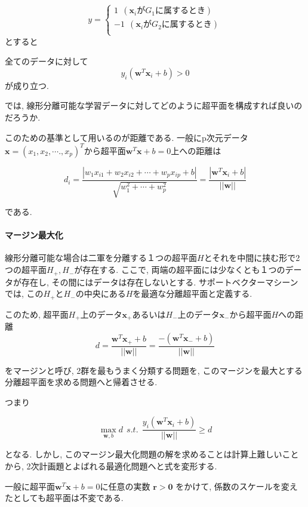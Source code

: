 \documentclass{jarticle}
\begin{document}
\begin{equation}
y = 
     \left\{
     \begin{aligned}
        1\ \ (\bm{x}_i\mbox{が} G_1 \mbox{に属するとき}) \\
        -1\ \ (\bm{x}_i\mbox{が} G_2 \mbox{に属するとき})\\
     \end{aligned}
     \right.
 \end{equation}
とすると 

全てのデータに対して
\[y_i(\bm{w}^T\bm{x}_i + b) > 0\]
が成り立つ.
 
 では, 線形分離可能な学習データに対してどのように超平面を構成すれば良いのだろうか.
 
このための基準として用いるのが距離である. 一般にp次元データ\(\bm{x} = (x_1, x_2, \cdots., x_p)^T\)から超平面$ \bm{w}^T\bm{x} + b = 0$上への距離は

 
 \[ d_i = \frac{|w_1x_{i1} + w_2x_{i2} + \cdots + w_px_{ip} + b|}{\sqrt{w_1^2 +\cdots+ w_p^2}} = \frac{|\bm{w}^T\bm{x}_i + b|}{||\bm{w}||}\]
 
 である.
 
 
\paragraph{マージン最大化}
 
 線形分離可能な場合は二軍を分離する１つの超平面$H$とそれを中間に挟む形で2つの超平面$ H_+, H_-$が存在する.
ここで, 両端の超平面には少なくとも１つのデータが存在し, その間にはデータは存在しないとする. サポートベクターマシーンでは, この$ H_+$と$ H_-$の中央にある$H$を最適な分離超平面と定義する.
 
 
 このため, 超平面$H_+$上のデータ$\bm{x}_+$あるいは$H_-$上のデータ$\bm{x}_-$から超平面$H$への距離
\[d = \frac{\bm{w}^T\bm{x}_+ + b}{||\bm{w}||} = \frac{-(\bm{w}^T\bm{x}_- + b)}{||\bm{w}||} \]

をマージンと呼び, 2群を最もうまく分類する問題を, このマージンを最大とする分離超平面を求める問題へと帰着させる. 
 
 つまり

\[\max_{\bm{w}, b} d\ \   s.t.\ \   \frac{y_i(\bm{w}^T\bm{x}_i + b)}{||\bm{w}||}\geq d \]

となる.
しかし, このマージン最大化問題の解を求めることは計算上難しいことから, 2次計画題とよばれる最適化問題ヘと式を変形する.

一般に超平面$  \bm{w}^T\bm{x} + b = 0$に任意の実数 $ \bm{r>0}$ をかけて, 係数のスケールを変えたとしても超平面は不変である.
 
\end{document}
